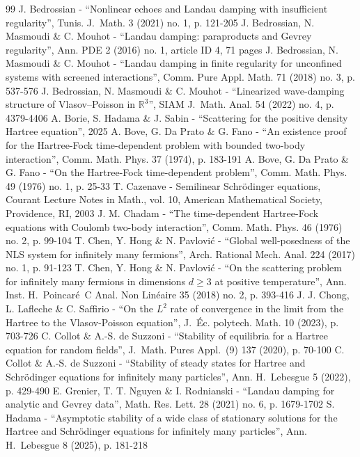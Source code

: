 \begin{thebibliography}{99}
 J. Bedrossian - “Nonlinear echoes and Landau damping with insufficient regularity”, Tunis. J. Math. 3 (2021) no. 1, p. 121-205
 J. Bedrossian, N. Masmoudi \& C. Mouhot - “Landau damping: paraproducts and Gevrey regularity”, Ann. PDE 2 (2016) no. 1, article ID 4, 71 pages
 J. Bedrossian, N. Masmoudi \& C. Mouhot - “Landau damping in finite regularity for unconfined systems with screened interactions”, Comm. Pure Appl. Math. 71 (2018) no. 3, p. 537-576
 J. Bedrossian, N. Masmoudi \& C. Mouhot - “Linearized wave-damping structure of Vlasov–Poisson in $\mathbb{R}^3$”, SIAM J. Math. Anal. 54 (2022) no. 4, p. 4379-4406
 A. Borie, S. Hadama \& J. Sabin - “Scattering for the positive density Hartree equation”, 2025
 A. Bove, G. Da Prato \& G. Fano - “An existence proof for the Hartree-Fock time-dependent problem with bounded two-body interaction”, Comm. Math. Phys. 37 (1974), p. 183-191
 A. Bove, G. Da Prato \& G. Fano - “On the Hartree-Fock time-dependent problem”, Comm. Math. Phys. 49 (1976) no. 1, p. 25-33
 T. Cazenave - Semilinear Schrödinger equations, Courant Lecture Notes in Math., vol. 10, American Mathematical Society, Providence, RI, 2003
 J. M. Chadam - “The time-dependent Hartree-Fock equations with Coulomb two-body interaction”, Comm. Math. Phys. 46 (1976) no. 2, p. 99-104
 T. Chen, Y. Hong \& N. Pavlović - “Global well-posedness of the NLS system for infinitely many fermions”, Arch. Rational Mech. Anal. 224 (2017) no. 1, p. 91-123
 T. Chen, Y. Hong \& N. Pavlović - “On the scattering problem for infinitely many fermions in dimensions $d\ge 3$ at positive temperature”, Ann. Inst. H. Poincaré C Anal. Non Linéaire 35 (2018) no. 2, p. 393-416
 J. J. Chong, L. Lafleche \& C. Saffirio - “On the $L^2$ rate of convergence in the limit from the Hartree to the Vlasov-Poisson equation”, J. Éc. polytech. Math. 10 (2023), p. 703-726
 C. Collot \& A.-S. de Suzzoni - “Stability of equilibria for a Hartree equation for random fields”, J. Math. Pures Appl. (9) 137 (2020), p. 70-100
 C. Collot \& A.-S. de Suzzoni - “Stability of steady states for Hartree and Schrödinger equations for infinitely many particles”, Ann. H. Lebesgue 5 (2022), p. 429-490
 E. Grenier, T. T. Nguyen \& I. Rodnianski - “Landau damping for analytic and Gevrey data”, Math. Res. Lett. 28 (2021) no. 6, p. 1679-1702
 S. Hadama - “Asymptotic stability of a wide class of stationary solutions for the Hartree and Schrödinger equations for infinitely many particles”, Ann. H. Lebesgue 8 (2025), p. 181-218

\end{thebibliography}
